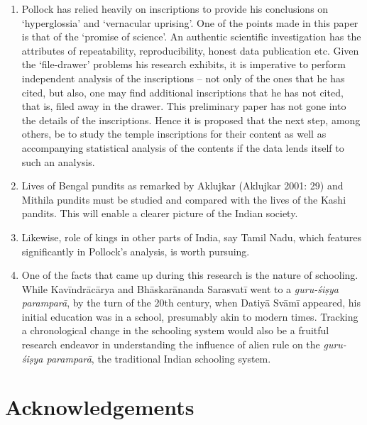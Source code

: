 \begin{enumerate}
\item Pollock has relied heavily on inscriptions to provide his conclusions on ‘hyperglossia’ and ‘vernacular uprising’. One of the points made in this paper is that of the ‘promise of science’. An authentic scientific investigation has the attributes of repeatability, reproducibility, honest data publication etc. Given the ‘file-drawer’ problems his research exhibits, it is imperative to perform independent analysis of the inscriptions – not only of the ones that he has cited, but also, one may find additional inscriptions that he has not cited, that is, filed away in the drawer. This preliminary paper has not gone into the details of the inscriptions. Hence it is proposed that the next step, among others, be to study the temple inscriptions for their content as well as accompanying statistical analysis of the contents if the data lends itself to such an analysis.

 \item Lives of Bengal pundits as remarked by Aklujkar (Aklujkar 2001: 29) and Mithila pundits must be studied and compared with the lives of the Kashi pandits. This will enable a clearer picture of the Indian society.

 \item Likewise, role of kings in other parts of India, say Tamil Nadu, which features significantly in Pollock’s analysis, is worth pursuing.

 \item One of the facts that came up during this research is the nature of schooling. While Kavīndrācārya and Bhāskarānanda Sarasvatī went to a \textit{guru-śiṣya paramparā}, by the turn of the 20th century, when Datiyā Svāmī appeared, his initial education was in a school, presumably akin to modern times. Tracking a chronological change in the schooling system would also be a fruitful research endeavor in understanding the influence of alien rule on the \textit{guru-śiṣya paramparā}, the traditional Indian schooling system.

\end{enumerate}


\newpage

\section*{Acknowledgements}

